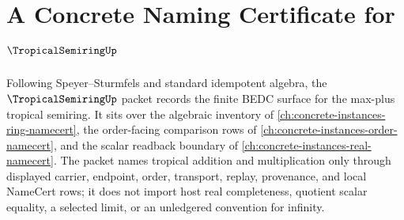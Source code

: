 \chapter{A Concrete Naming Certificate for $\TropicalSemiringUp$}
\label{ch:concrete-instances-tropical-semiring-namecert}

Following Speyer--Sturmfels and standard idempotent algebra, the $\TropicalSemiringUp$ packet records the finite BEDC surface for the max-plus tropical semiring. It sits over the algebraic inventory of \autoref{ch:concrete-instances-ring-namecert}, the order-facing comparison rows of \autoref{ch:concrete-instances-order-namecert}, and the scalar readback boundary of \autoref{ch:concrete-instances-real-namecert}. The packet names tropical addition and multiplication only through displayed carrier, endpoint, order, transport, replay, provenance, and local NameCert rows; it does not import host real completeness, quotient scalar equality, a selected limit, or an unledgered convention for infinity.

